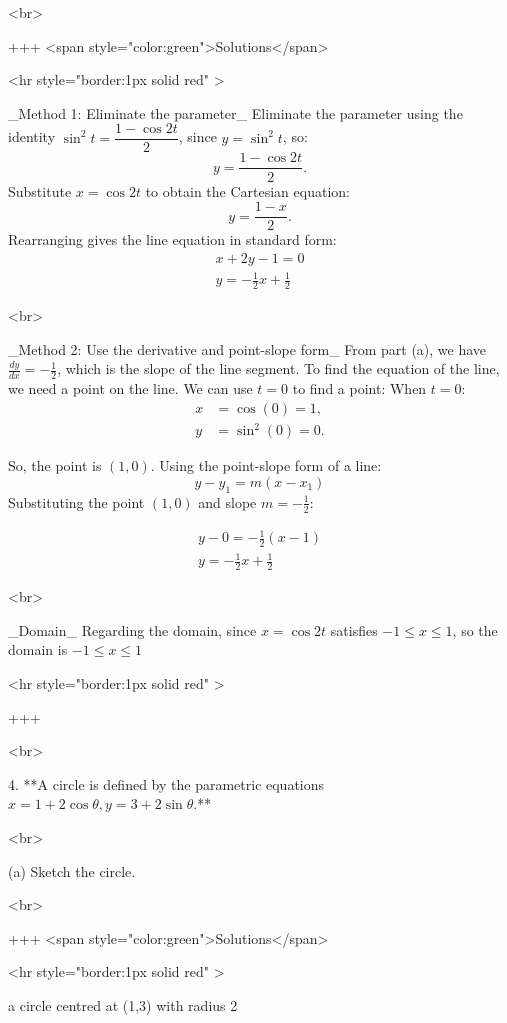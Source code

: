 <br>

+++ <span style="color:green">Solutions</span>

<hr style="border:1px solid red" >

_Method 1: Eliminate the parameter_
Eliminate the parameter using the identity $\sin^2 t = \dfrac{1-\cos 2t}{2}$, since $y=\sin^2 t$, so:
$$
y = \frac{1-\cos 2t}{2}.
$$
Substitute $x=\cos 2t$ to obtain the Cartesian equation:
$$
y = \frac{1-x}{2}.
$$
Rearranging gives the line equation in standard form:
$$
\begin{align*}
x + 2y - 1 = 0\\
y = -\frac{1}{2}x  + \frac{1}{2}
\end{align*}
$$

<br>


_Method 2: Use the derivative and point-slope form_
From part (a), we have $\frac{dy}{dx} = -\frac{1}{2}$, which is the slope of the line segment. To find the equation of the line, we need a point on the line. We can use $t=0$ to find a point:
When $t=0$:
\begin{align*}
x &= \cos(0) = 1, \\
y &= \sin^2(0) = 0.
\end{align*}

So, the point is $(1, 0)$. Using the point-slope form of a line:
$$
y - y_1 = m(x - x_1)
$$
Substituting the point $(1, 0)$ and slope $m = -\frac{1}{2}$:

$$
\begin{align*}
y - 0 = -\frac{1}{2}(x - 1)\\
y = -\frac{1}{2}x  + \frac{1}{2}
\end{align*}
$$

<br>

_Domain_
Regarding the domain, since $x=\cos 2t$ satisfies $-1\le x\le 1$, so the domain is $-1\le x\le 1$

<hr style="border:1px solid red" >

+++

<br>

4. **A circle is defined by the parametric equations $x=1+2 \cos \theta, y=3+2 \sin \theta$.**

<br>

(a) Sketch the circle.

<br>

+++ <span style="color:green">Solutions</span>

<hr style="border:1px solid red" >

a circle centred at (1,3) with radius 2

